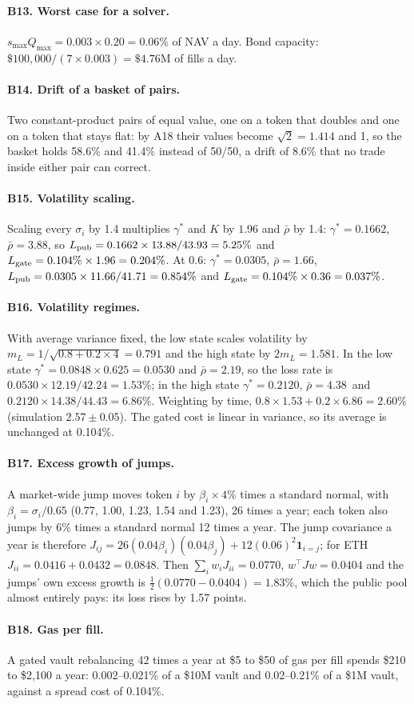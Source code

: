 \paragraph{B13. Worst case for a solver.} $s_{\max}Q_{\max}=0.003\times0.20=0.06\%$ of NAV a day. Bond capacity: $\$100{,}000/(7\times0.003)=\$4.76$M of fills a day.

\paragraph{B14. Drift of a basket of pairs.} Two constant-product pairs of equal value, one on a token that doubles and one on a token that stays flat: by A18 their values become $\sqrt2=1.414$ and 1, so the basket holds 58.6\% and 41.4\% instead of 50/50, a drift of 8.6\% that no trade inside either pair can correct.

\paragraph{B15. Volatility scaling.} Scaling every $\sigma_i$ by 1.4 multiplies $\gamma^{*}$ and $K$ by $1.96$ and $\bar\rho$ by 1.4: $\gamma^{*}=0.1662$, $\bar\rho=3.88$\bps, so $L_{\mathrm{pub}}=0.1662\times13.88/43.93=5.25\%$ and $L_{\mathrm{gate}}=0.104\%\times1.96=0.204\%$. At 0.6: $\gamma^{*}=0.0305$, $\bar\rho=1.66$\bps, $L_{\mathrm{pub}}=0.0305\times11.66/41.71=0.854\%$ and $L_{\mathrm{gate}}=0.104\%\times0.36=0.037\%$.

\paragraph{B16. Volatility regimes.} With average variance fixed, the low state scales volatility by $m_L=1/\sqrt{0.8+0.2\times4}=0.791$ and the high state by $2m_L=1.581$. In the low state $\gamma^{*}=0.0848\times0.625=0.0530$ and $\bar\rho=2.19$\bps, so the loss rate is $0.0530\times12.19/42.24=1.53\%$; in the high state $\gamma^{*}=0.2120$, $\bar\rho=4.38$\bps\ and $0.2120\times14.38/44.43=6.86\%$. Weighting by time, $0.8\times1.53+0.2\times6.86=2.60\%$ (simulation $2.57\pm0.05$). The gated cost is linear in variance, so its average is unchanged at 0.104\%.

\paragraph{B17. Excess growth of jumps.} A market-wide jump moves token $i$ by $\beta_i\times4\%$ times a standard normal, with $\beta_i=\sigma_i/0.65$ (0.77, 1.00, 1.23, 1.54 and 1.23), 26 times a year; each token also jumps by 6\% times a standard normal 12 times a year. The jump covariance a year is therefore $J_{ij}=26(0.04\beta_i)(0.04\beta_j)+12(0.06)^2\mathbf 1_{i=j}$; for ETH $J_{ii}=0.0416+0.0432=0.0848$. Then $\sum_iw_iJ_{ii}=0.0770$, $w^{\top}Jw=0.0404$ and the jumps' own excess growth is $\tfrac12(0.0770-0.0404)=1.83\%$, which the public pool almost entirely pays: its loss rises by 1.57 points.

\paragraph{B18. Gas per fill.} A gated vault rebalancing 42 times a year at \$5 to \$50 of gas per fill spends \$210 to \$2{,}100 a year: 0.002--0.021\% of a \$10M vault and 0.02--0.21\% of a \$1M vault, against a spread cost of 0.104\%.
